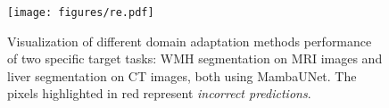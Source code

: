 \begin{figure}[b]
\vspace{-0.5cm}
    \centering
    \texttt{[image: figures/re.pdf]}
    \vspace{-0.5cm}
    \caption{Visualization of different domain adaptation methods performance of two specific target tasks:
    WMH segmentation on MRI images and liver segmentation on CT images, both using MambaUNet. The pixels highlighted in red represent \textit{incorrect predictions}.
    }
    \label{result}
    \vspace{-0.5cm}
\end{figure}